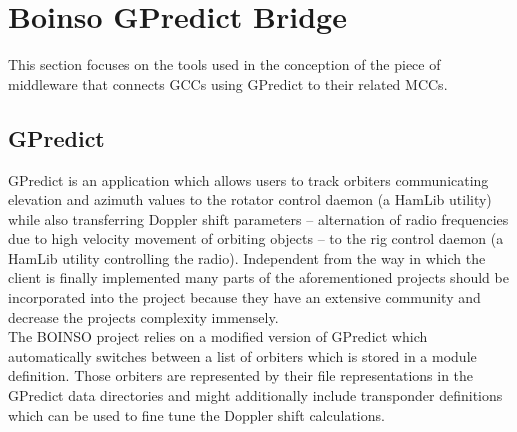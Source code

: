 \documentclass[BachelorPaper]{subfiles}
\begin{document}
\section{Boinso GPredict Bridge}
\label{sec:mat_boinso_bridge}
This section focuses on the tools used in the conception of the piece of middleware that connects \acp{GCC} using GPredict to their related \acp{MCC}.

\subsection{GPredict}
\label{subsec:mat_gpredict}
GPredict is an application which allows users to track orbiters communicating elevation and azimuth values to the rotator control daemon (a \ac{HamLib} utility) while also transferring Doppler shift parameters -- alternation of radio frequencies due to high velocity movement of orbiting objects -- to the rig control daemon (a \ac{HamLib} utility controlling the radio). Independent from the way in which the client is finally implemented many parts of the aforementioned projects should be incorporated into the project because they have an extensive community and decrease the projects complexity immensely.\\

The BOINSO project relies on a modified version of GPredict which automatically switches between a list of orbiters which is stored in a module definition. Those orbiters are represented by their file representations in the GPredict data directories and might additionally include transponder definitions which can be used to fine tune the Doppler shift calculations.
\end{document}
